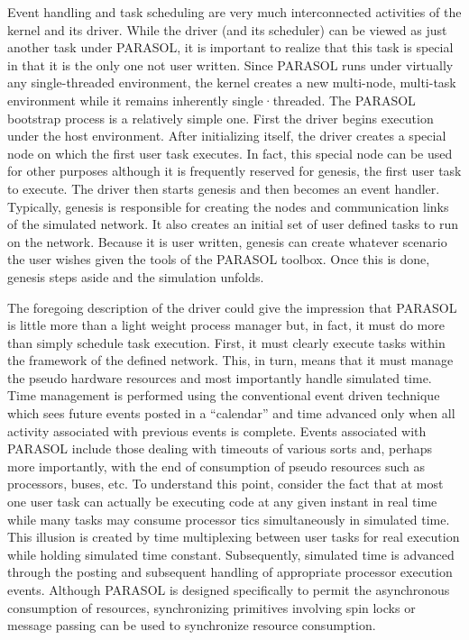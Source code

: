 \documentclass[11pt]{article}
\begin{document}
Event handling and task scheduling are very much interconnected activities of the kernel and its
driver. While the driver (and its scheduler) can be viewed as just another task under PARASOL, it
is important to realize that this task is special in that it is the only one not user written. Since
PARASOL runs under virtually any single-threaded environment, the kernel creates a new
multi-node, multi-task environment while it remains inherently single·threaded. The PARASOL
bootstrap process is a relatively simple one. First the driver begins execution under the host
environment. After initializing itself, the driver creates a special node on which the first user task
executes. In fact, this special node can be used for other purposes although it is frequently
reserved for genesis, the first user task to execute. The driver then starts genesis and then becomes
an event handler. Typically, genesis is responsible for creating the nodes and communication links
of the simulated network. It also creates an initial set of user defined tasks to run on the network.
Because it is user written, genesis can create whatever scenario the user wishes given the tools of
the PARASOL toolbox. Once this is done, genesis steps aside and the simulation unfolds.

The foregoing description of the driver could give the impression that PARASOL is little more than
a light weight process manager but, in fact, it must do more than simply schedule task execution.
First, it must clearly execute tasks within the framework of the defined network. This, in turn,
means that it must manage the pseudo hardware resources and most importantly handle simulated
time. Time management is performed using the conventional event driven technique which sees
future events posted in a ``calendar'' and time advanced only when all activity associated with
previous events is complete. Events associated with PARASOL include those dealing with
timeouts of various sorts and, perhaps more importantly, with the end of consumption of pseudo
resources such as processors, buses, etc. To understand this point, consider the fact that at most
one user task can actually be executing code at any given instant in real time while many tasks may
consume processor tics simultaneously in simulated time. This illusion is created by time
multiplexing between user tasks for real execution while holding simulated time constant.
Subsequently, simulated time is advanced through the posting and subsequent handling of
appropriate processor execution events. Although PARASOL is designed specifically to permit the
asynchronous consumption of resources, synchronizing primitives involving spin locks or
message passing can be used to synchronize resource consumption.
\end{document}
